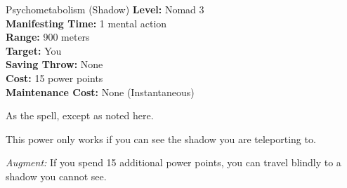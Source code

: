 {Psychometabolism (Shadow)}
{
	\textbf{Level:}
	Nomad 3\\
	\textbf{Manifesting Time:}
	1 mental action\\
	\textbf{Range:}
	900 meters\\
	\textbf{Target:}
	You\\
	\textbf{Saving Throw:}
	None\\
	\textbf{Cost:}
	15 power points\\
	\textbf{Maintenance Cost:}
	None (Instantaneous)\\
}
{
	As the  spell, except as noted here.

	This power only works if you can see the shadow you are teleporting to.

	\textit{Augment:} If you spend 15 additional power points, you can travel blindly to a shadow you cannot see.
}